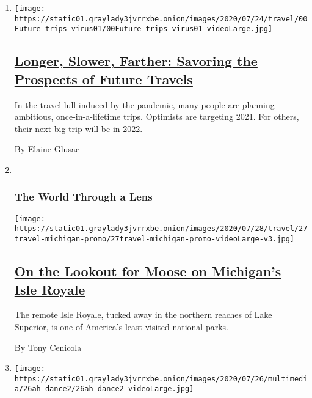 \begin{enumerate}
\def\labelenumi{\arabic{enumi}.}
\item
  \texttt{[image: https://static01.graylady3jvrrxbe.onion/images/2020/07/24/travel/00Future-trips-virus01/00Future-trips-virus01-videoLarge.jpg]}

  \hypertarget{longer-slower-farther-savoring-the-prospects-of-future-travels}{%
  \subsection{\texorpdfstring{\href{/2020/07/28/travel/future-travel-bucket-list-coronavirus.html}{Longer,
  Slower, Farther: Savoring the Prospects of Future
  Travels}}{Longer, Slower, Farther: Savoring the Prospects of Future Travels}}\label{longer-slower-farther-savoring-the-prospects-of-future-travels}}

  In the travel lull induced by the pandemic, many people are planning
  ambitious, once-in-a-lifetime trips. Optimists are targeting 2021. For
  others, their next big trip will be in 2022.

  By Elaine Glusac
\item ~
  \hypertarget{the-world-through-a-lens-1}{%
  \subsubsection{The World Through a
  Lens}\label{the-world-through-a-lens-1}}

  \texttt{[image: https://static01.graylady3jvrrxbe.onion/images/2020/07/28/travel/27travel-michigan-promo/27travel-michigan-promo-videoLarge-v3.jpg]}

  \hypertarget{on-the-lookout-for-moose-on-michigans-isle-royale}{%
  \subsection{\texorpdfstring{\href{/2020/07/27/travel/moose-michigan-isle-royale.html}{On
  the Lookout for Moose on Michigan's Isle
  Royale}}{On the Lookout for Moose on Michigan's Isle Royale}}\label{on-the-lookout-for-moose-on-michigans-isle-royale}}

  The remote Isle Royale, tucked away in the northern reaches of Lake
  Superior, is one of America's least visited national parks.

  By Tony Cenicola
\item
  \texttt{[image: https://static01.graylady3jvrrxbe.onion/images/2020/07/26/multimedia/26ah-dance2/26ah-dance2-videoLarge.jpg]}


\end{enumerate}
